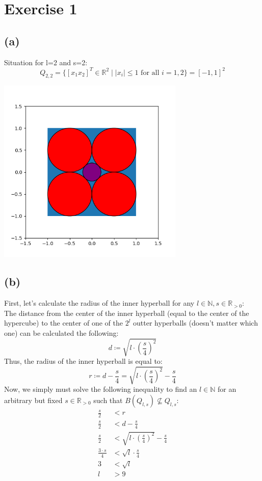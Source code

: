 \documentclass[12pt]{article}
\begin{document}
\section*{Exercise 1}
\subsection*{(a)}
Situation for l=2 and s=2:
\[Q_{2,2}=\lbrace [x_1 x_2]^T\in\mathbb{R}^2\mid |x_i|\leq 1 \text{ for all } i=1,2\rbrace = [-1,1]^2\]
\begin{center}
	\includegraphics[width=3.5in]{code/exercise_01_a.png}
\end{center}

\subsection*{(b)}
First, let's calculate the radius of the inner hyperball for any $l \in \mathbb{N}, s \in \mathbb{R}_{>0}$: \\
The distance from the center of the inner hyperball (equal to the center of the hypercube) to the center of one of the $2^l$ outter hyperballs (doesn't matter which one) can be calculated the following:
\begin{equation*}
	d \coloneqq \sqrt{l \cdot \left( \frac{s}{4} \right)^2}
\end{equation*}
Thus, the radius of the inner hyperball is equal to:
\begin{equation*}
	r \coloneqq d - \frac{s}{4} = \sqrt{l \cdot \left( \frac{s}{4} \right)^2} - \frac{s}{4}
\end{equation*}
Now, we simply must solve the following inequality to find an $l \in \mathbb{N}$ for an arbitrary but fixed $s \in \mathbb{R}_{>0}$ such that $B(Q_{l,s}) \not\subseteq Q_{l,s}$:
\begin{align*}
	\frac{s}{2} &< r \\
	\frac{s}{2} &< d - \frac{s}{4} \\
	\frac{s}{2} &< \sqrt{l \cdot \left( \frac{s}{4} \right)^2} - \frac{s}{4} \\
	\frac{3 \cdot s}{4} &< \sqrt{l} \cdot \frac{s}{4} \\
	3 &< \sqrt{l} \\
	l &> 9
\end{align*}
\end{document}
